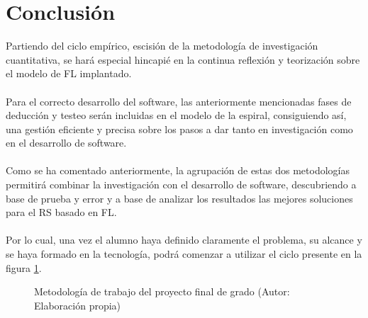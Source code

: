 \section{Conclusión}
Partiendo del ciclo empírico, escisión de la metodología de investigación cuantitativa, se hará especial hincapié en la continua reflexión y teorización sobre el modelo de FL implantado. 
\\ \\
Para el correcto desarrollo del software, las anteriormente mencionadas fases de deducción y testeo serán incluidas en el modelo de la espiral, consiguiendo así, una gestión eficiente y precisa sobre los pasos a dar tanto en investigación como en el desarrollo de software.
\\ \\
Como se ha comentado anteriormente, la agrupación de estas dos metodologías permitirá combinar la investigación con el desarrollo de software, descubriendo a base de prueba y error y a base de analizar los resultados las mejores soluciones para el RS basado en FL.
\\ \\
Por lo cual, una vez el alumno haya definido claramente el problema, su alcance y se haya formado en la tecnología, podrá comenzar a utilizar el ciclo presente en la figura \ref{fig:MetodologiaCombinada}.

\begin{figure}[thbp]
    \centering
    \caption{Metodología de trabajo del proyecto final de grado (Autor: Elaboración propia)} 
    \label{fig:MetodologiaCombinada}
\end{figure}
